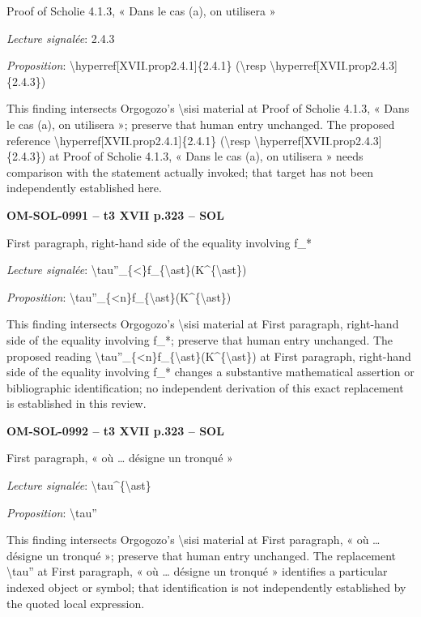 Proof of Scholie 4.1.3, « Dans le cas (a), on utilisera »\par
\emph{Lecture signalée}: 2.4.3\par
\emph{Proposition}: \textbackslash{}hyperref[XVII.prop2.4.1]\{2.4.1\} (\textbackslash{}resp \textbackslash{}hyperref[XVII.prop2.4.3]\{2.4.3\})\par
This finding intersects Orgogozo's \textbackslash{}sisi material at Proof of Scholie 4.1.3, « Dans le cas (a), on utilisera »; preserve that human entry unchanged. The proposed reference \textbackslash{}hyperref[XVII.prop2.4.1]\{2.4.1\} (\textbackslash{}resp \textbackslash{}hyperref[XVII.prop2.4.3]\{2.4.3\}) at Proof of Scholie 4.1.3, « Dans le cas (a), on utilisera » needs comparison with the statement actually invoked; that target has not been independently established here.\par
\par\noindent\textbf{OM-SOL-0991 -- t3 XVII p.323 -- SOL}\par
First paragraph, right-hand side of the equality involving f\_*\par
\emph{Lecture signalée}: \textbackslash{}tau''\_\{<\}f\_\{\textbackslash{}ast\}(K\textasciicircum{}\{\textbackslash{}ast\})\par
\emph{Proposition}: \textbackslash{}tau''\_\{<n\}f\_\{\textbackslash{}ast\}(K\textasciicircum{}\{\textbackslash{}ast\})\par
This finding intersects Orgogozo's \textbackslash{}sisi material at First paragraph, right-hand side of the equality involving f\_*; preserve that human entry unchanged. The proposed reading \textbackslash{}tau''\_\{<n\}f\_\{\textbackslash{}ast\}(K\textasciicircum{}\{\textbackslash{}ast\}) at First paragraph, right-hand side of the equality involving f\_* changes a substantive mathematical assertion or bibliographic identification; no independent derivation of this exact replacement is established in this review.\par
\par\noindent\textbf{OM-SOL-0992 -- t3 XVII p.323 -- SOL}\par
First paragraph, « où … désigne un tronqué »\par
\emph{Lecture signalée}: \textbackslash{}tau\textasciicircum{}\{\textbackslash{}ast\}\par
\emph{Proposition}: \textbackslash{}tau''\par
This finding intersects Orgogozo's \textbackslash{}sisi material at First paragraph, « où … désigne un tronqué »; preserve that human entry unchanged. The replacement \textbackslash{}tau'' at First paragraph, « où … désigne un tronqué » identifies a particular indexed object or symbol; that identification is not independently established by the quoted local expression.\par
